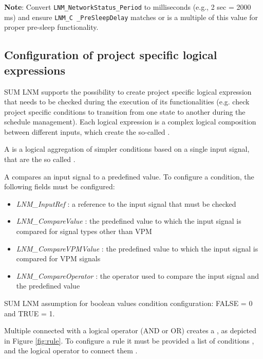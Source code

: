 \textbf{Note}: Convert \texttt{LNM\_NetworkStatus\_Period} to milliseconds (e.g., 2 sec = 2000 ms) and ensure \texttt{LNM\_C \_PreSleepDelay} matches or is a multiple of this value for proper pre-sleep functionality.

\subsection{Configuration of project specific logical expressions}
\label{subsec:ProjSpecificLogicExp}

SUM LNM supports the possibility to create project specific logical expression that needs \newline to be checked during the execution of its functionalities (e.g. check project specific conditions to transition from one state to another during the schedule management). Each logical expression is a complex logical composition between different inputs, which create the so-called .


A  is a logical aggregation of simpler conditions based on a single input signal, that are the so called .

A  compares an input signal to a predefined value. To configure a condition, the following fields must be configured:

\begin{itemize}
\item \textit{LNM\_InputRef} : a reference to the input signal that must be checked
\item \textit{LNM\_CompareValue} : the predefined value to which the input signal is compared for signal types other than VPM
\item \textit{LNM\_CompareVPMValue} : the predefined value to which the input signal is compared for VPM signals
\item \textit{LNM\_CompareOperator} : the operator used to compare the input signal and the predefined value
\end{itemize}


SUM LNM assumption for boolean values condition configuration: FALSE = 0 and TRUE = 1.


Multiple  connected with a logical operator (AND or OR) creates a , as depicted in Figure \ref{fig:rule}. To configure a rule it must be provided a list of conditions , and the logical operator to connect them .


